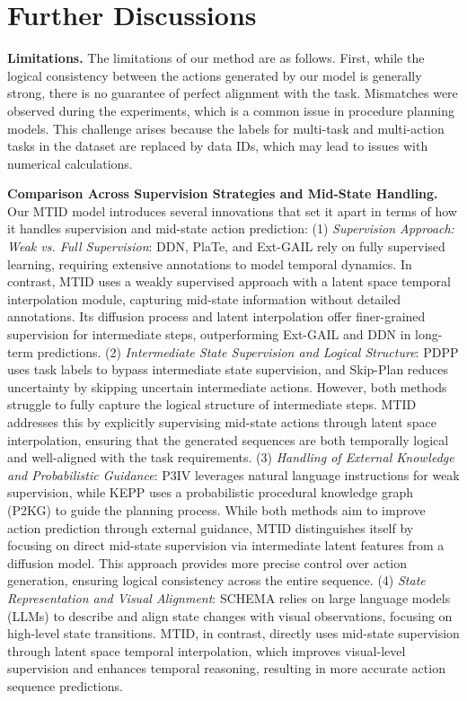 \section{Further Discussions}

\textbf{Limitations.} The limitations of our method are as follows. First, while the logical consistency between the actions generated by our model is generally strong, there is no guarantee of perfect alignment with the task. Mismatches were observed during the experiments, which is a common issue in procedure planning models. This challenge arises because the labels for multi-task and multi-action tasks in the dataset are replaced by data IDs, which may lead to issues with numerical calculations. 


\textbf{Comparison Across Supervision Strategies and Mid-State Handling.} Our MTID model introduces several innovations that set it apart in terms of how it handles supervision and mid-state action prediction:
(1) \textit{Supervision Approach: Weak vs. Full Supervision}:
DDN, PlaTe, and Ext-GAIL rely on fully supervised learning, requiring extensive annotations to model temporal dynamics. In contrast, MTID uses a weakly supervised approach with a latent space temporal interpolation module, capturing mid-state information without detailed annotations. Its diffusion process and latent interpolation offer finer-grained supervision for intermediate steps, outperforming Ext-GAIL and DDN in long-term predictions.
(2) \textit{Intermediate State Supervision and Logical Structure}:
PDPP uses task labels to bypass intermediate state supervision, and Skip-Plan reduces uncertainty by skipping uncertain intermediate actions. However, both methods struggle to fully capture the logical structure of intermediate steps. MTID addresses this by explicitly supervising mid-state actions through latent space interpolation, ensuring that the generated sequences are both temporally logical and well-aligned with the task requirements.
(3) \textit{Handling of External Knowledge and Probabilistic Guidance}:
P3IV leverages natural language instructions for weak supervision, while KEPP uses a probabilistic procedural knowledge graph (P2KG) to guide the planning process. While both methods aim to improve action prediction through external guidance, MTID distinguishes itself by focusing on direct mid-state supervision via intermediate latent features from a diffusion model. This approach provides more precise control over action generation, ensuring logical consistency across the entire sequence.
(4) \textit{State Representation and Visual Alignment}:
SCHEMA relies on large language models (LLMs) to describe and align state changes with visual observations, focusing on high-level state transitions. MTID, in contrast, directly uses mid-state supervision through latent space temporal interpolation, which improves visual-level supervision and enhances temporal reasoning, resulting in more accurate action sequence predictions.

